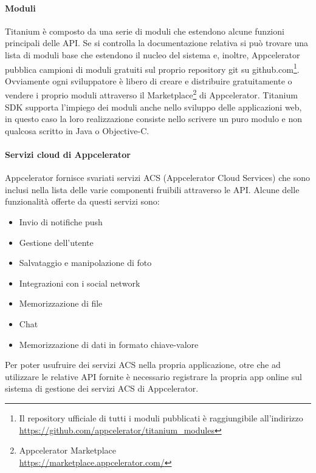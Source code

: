 			\paragraph{Moduli}
				Titanium è composto da una serie di moduli che estendono alcune 
				funzioni principali delle API. Se si controlla la documentazione 
				relativa si può trovare una lista di moduli base che estendono 
				il nucleo del sistema e, inoltre, Appcelerator pubblica 
				campioni di moduli gratuiti sul proprio repository git su 
				\mbox{github.com}\footnote{Il repository ufficiale di tutti i 
				moduli pubblicati è	raggiungibile all'indirizzo\\
				\url{https://github.com/appcelerator/titanium_modules}}. 
				Ovviamente ogni sviluppatore è libero di creare e distribuire 
				gratuitamente o vendere i proprio moduli attraverso il 
				Marketplace\footnote{Appcelerator Marketplace\\
				\url{https://marketplace.appcelerator.com/}} 
				di Appcelerator. Titanium SDK supporta l'impiego dei moduli 
				anche nello sviluppo delle applicazioni web, in questo caso la 
				loro realizzazione consiste nello scrivere un puro modulo 
				\js{} e non qualcosa scritto in Java o Objective-C.
			
			\clearpage
			\paragraph{Servizi cloud di Appcelerator}
				Appcelerator fornisce svariati servizi ACS (Appcelerator Cloud 
				Services) che sono inclusi nella lista delle varie componenti 
				fruibili attraverso le API. Alcune delle funzionalità offerte da 
				questi servizi sono:
				\begin{itemize}
					\item Invio di notifiche push
					\item Gestione dell'utente
					\item Salvataggio e manipolazione di foto
					\item Integrazioni con i social network
					\item Memorizzazione di file
					\item Chat
					\item Memorizzazione di dati in formato chiave-valore
				\end{itemize}
				Per poter usufruire dei servizi ACS nella propria applicazione, 
				otre che ad utilizzare le relative API fornite è necessario 
				registrare la propria app online sul sistema di gestione dei 
				servizi ACS di Appcelerator.
			
